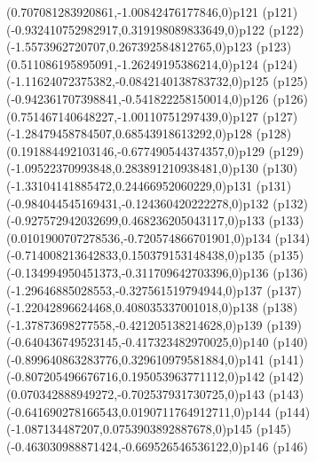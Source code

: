\psPoint(0.707081283920861,-1.00842476177846,0){p121}
\psdot(p121)
\psPoint(-0.932410752982917,0.319198089833649,0){p122}
\psdot(p122)
\psPoint(-1.5573962720707,0.267392584812765,0){p123}
\psdot(p123)
\psPoint(0.511086195895091,-1.26249195386214,0){p124}
\psdot(p124)
\psPoint(-1.11624072375382,-0.0842140138783732,0){p125}
\psdot(p125)
\psPoint(-0.942361707398841,-0.541822258150014,0){p126}
\psdot(p126)
\psPoint(0.751467140648227,-1.00110751297439,0){p127}
\psdot(p127)
\psPoint(-1.28479458784507,0.68543918613292,0){p128}
\psdot(p128)
\psPoint(0.191884492103146,-0.677490544374357,0){p129}
\psdot(p129)
\psPoint(-1.09522370993848,0.283891210938481,0){p130}
\psdot(p130)
\psPoint(-1.33104141885472,0.24466952060229,0){p131}
\psdot(p131)
\psPoint(-0.984044545169431,-0.124360420222278,0){p132}
\psdot(p132)
\psPoint(-0.927572942032699,0.468236205043117,0){p133}
\psdot(p133)
\psPoint(0.0101900707278536,-0.720574866701901,0){p134}
\psdot(p134)
\psPoint(-0.714008213642833,0.150379153148438,0){p135}
\psdot(p135)
\psPoint(-0.134994950451373,-0.311709642703396,0){p136}
\psdot(p136)
\psPoint(-1.29646885028553,-0.327561519794944,0){p137}
\psdot(p137)
\psPoint(-1.22042896624468,0.408035337001018,0){p138}
\psdot(p138)
\psPoint(-1.37873698277558,-0.421205138214628,0){p139}
\psdot(p139)
\psPoint(-0.640436749523145,-0.417323482970025,0){p140}
\psdot(p140)
\psPoint(-0.899640863283776,0.329610979581884,0){p141}
\psdot(p141)
\psPoint(-0.807205496676716,0.195053963771112,0){p142}
\psdot(p142)
\psPoint(0.070342888949272,-0.702537931730725,0){p143}
\psdot(p143)
\psPoint(-0.641690278166543,0.0190711764912711,0){p144}
\psdot(p144)
\psPoint(-1.087134487207,0.0753903892887678,0){p145}
\psdot(p145)
\psPoint(-0.463030988871424,-0.669526546536122,0){p146}
\psdot(p146)
